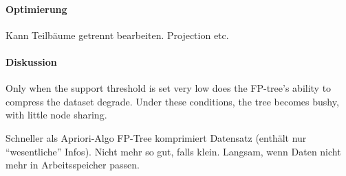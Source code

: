\documentclass[10pt]{article} %
\begin{document}

\paragraph{Optimierung}
   Kann Teilbäume getrennt bearbeiten.  Projection etc. 

\paragraph{Diskussion} Only when the support threshold is set very low does
the FP-tree’s ability to compress the dataset degrade. Under these
conditions, the tree becomes bushy, with little node sharing.

\begin{cptitemize}
  \advantageit Schneller als Apriori-Algo
  \advantageit FP-Tree komprimiert Datensatz (enthält nur ``wesentliche''
  Infos). Nicht mehr so gut, falls  klein.
  \disadvantageit Langsam, wenn Daten nicht mehr in Arbeitsspeicher passen.
\end{cptitemize}
\end{document}
